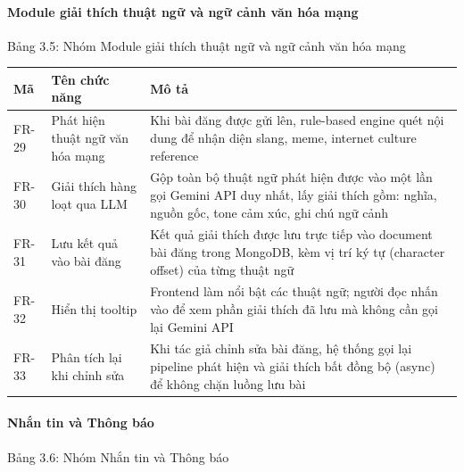 \paragraph{\texorpdfstring{Module giải thích thuật ngữ và ngữ cảnh văn
hóa mạng}{Module giải thích thuật ngữ và ngữ cảnh văn hóa mạng}}\label{module-giai-thich-thuat-ngu-van-hoa-mang}

Bảng 3.5: Nhóm Module giải thích thuật ngữ và ngữ cảnh văn hóa mạng

{\def\LTcaptype{none} %
\begin{longtable}{
  |>{\centering\arraybackslash}p{}
  |>{\centering\arraybackslash}p{}
  |>{\centering\arraybackslash}p{}|}
\endhead
\hline
\endlastfoot
Mã & Tên chức năng & Mô tả \\ \hline
FR-29 & Phát hiện thuật ngữ văn hóa mạng & Khi bài đăng được gửi lên,
rule-based engine quét nội dung để nhận diện slang, meme, internet
culture reference \\ \hline
FR-30 & Giải thích hàng loạt qua LLM & Gộp toàn bộ thuật ngữ phát hiện
được vào một lần gọi Gemini API duy nhất, lấy giải thích gồm: nghĩa,
nguồn gốc, tone cảm xúc, ghi chú ngữ cảnh \\ \hline
FR-31 & Lưu kết quả vào bài đăng & Kết quả giải thích được lưu trực tiếp
vào document bài đăng trong MongoDB, kèm vị trí ký tự (character offset)
của từng thuật ngữ \\ \hline
FR-32 & Hiển thị tooltip & Frontend làm nổi bật các thuật ngữ; người đọc
nhấn vào để xem phần giải thích đã lưu mà không cần gọi lại Gemini API \\ \hline
FR-33 & Phân tích lại khi chỉnh sửa & Khi tác giả chỉnh sửa bài đăng, hệ
thống gọi lại pipeline phát hiện và giải thích bất đồng bộ (async) để
không chặn luồng lưu bài \\ \hline
\end{longtable}
}

\paragraph{Nhắn tin và Thông
báo}\label{nhux1eafn-tin-vuxe0-thuxf4ng-buxe1o}

Bảng 3.6: Nhóm Nhắn tin và Thông báo


